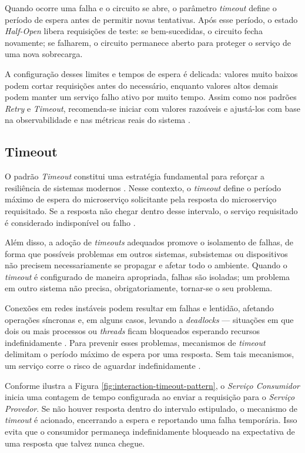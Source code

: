 Quando ocorre uma falha e o circuito se abre, o parâmetro \textit{timeout} define o período de espera antes de permitir novas tentativas. Após esse período, o estado \textit{Half-Open} libera requisições de teste: se bem-sucedidas, o circuito fecha novamente; se falharem, o circuito permanece aberto para proteger o serviço de uma nova sobrecarga.

A configuração desses limites e tempos de espera é delicada: valores muito baixos podem cortar requisições antes do necessário, enquanto valores altos demais podem manter um serviço falho ativo por muito tempo. Assim como nos padrões \textit{Retry} e \textit{Timeout}, recomenda-se iniciar com valores razoáveis e ajustá-los com base na observabilidade e nas métricas reais do sistema \citep{Newman:15:MS}.

\subsection{Timeout}
O padrão \textit{Timeout} constitui uma estratégia fundamental para reforçar a resiliência de sistemas modernos \citep{kostenko2023antifragile}. Nesse contexto, o \textit{timeout} define o período máximo de espera do microserviço solicitante pela resposta do microserviço requisitado. Se a resposta não chegar dentro desse intervalo, o serviço requisitado é considerado indisponível ou falho \citep{alashqar2022microservices}.

Além disso, a adoção de \textit{timeouts} adequados promove o isolamento de falhas, de forma que possíveis problemas em outros sistemas, subsistemas ou dispositivos não precisem necessariamente se propagar e afetar todo o ambiente. Quando o \textit{timeout} é configurado de maneira apropriada, falhas são isoladas; um problema em outro sistema não precisa, obrigatoriamente, tornar-se o seu problema. \citep{nygard2018release}

Conexões em redes instáveis podem resultar em falhas e lentidão, afetando operações síncronas e, em alguns casos, levando a \textit{deadlocks} — situações em que dois ou mais processos ou \textit{threads} ficam bloqueados esperando recursos indefinidamente \citep{troubitsyna2019}. Para prevenir esses problemas, mecanismos de \textit{timeout} delimitam o período máximo de espera por uma resposta. Sem tais mecanismos, um serviço corre o risco de aguardar indefinidamente \citep{kostenko2023antifragile}.

Conforme ilustra a Figura \ref{fig:interaction-timeout-pattern}, o \textit{Serviço Consumidor} inicia uma contagem de tempo configurada ao enviar a requisição para o \textit{Serviço Provedor}. Se não houver resposta dentro do intervalo estipulado, o mecanismo de \textit{timeout} é acionado, encerrando a espera e reportando uma falha temporária. Isso evita que o consumidor permaneça indefinidamente bloqueado na expectativa de uma resposta que talvez nunca chegue.

